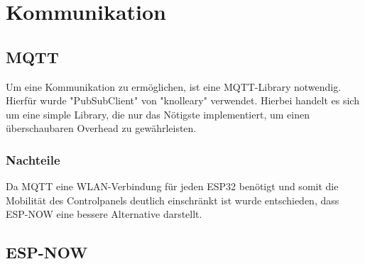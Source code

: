 \section{Kommunikation}
    \subsection{MQTT}
    Um eine Kommunikation zu ermöglichen, ist eine 
    MQTT-Library notwendig. Hierfür wurde "PubSubClient" von 
    "knolleary" verwendet. Hierbei handelt es sich um eine 
    simple Library, die nur das Nötigste implementiert, um
    einen überschaubaren Overhead zu gewährleisten.
        \subsubsection{Nachteile}
        Da MQTT eine WLAN-Verbindung für jeden ESP32
        benötigt und somit die Mobilität des Controlpanels
        deutlich einschränkt ist wurde entschieden, dass 
        ESP-NOW eine bessere Alternative darstellt.
    
    \subsection{ESP-NOW}